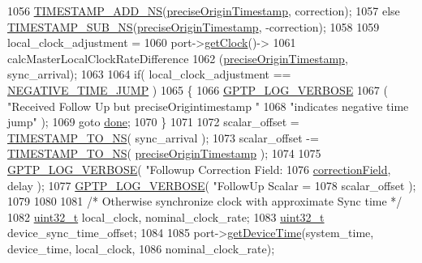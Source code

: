 \begin{DoxyCode}
1056         \hyperlink{ieee1588_8hpp_a1fb9aa7a530487fc6872dfce9a4f41b3}{TIMESTAMP\_ADD\_NS}(\hyperlink{class_p_t_p_message_follow_up_ab410646215c0bcbaf124d5923f22e2ca}{preciseOriginTimestamp}, correction);
1057     \textcolor{keywordflow}{else} \hyperlink{ieee1588_8hpp_ae4bf4339881295a97a340d4c59b0caa6}{TIMESTAMP\_SUB\_NS}(\hyperlink{class_p_t_p_message_follow_up_ab410646215c0bcbaf124d5923f22e2ca}{preciseOriginTimestamp}, -correction);
1058 
1059     local\_clock\_adjustment =
1060         port->\hyperlink{class_common_port_ab8e59ecfb51ec14e166bc8bfc872b1ef}{getClock}()->
1061         calcMasterLocalClockRateDifference
1062         (\hyperlink{class_p_t_p_message_follow_up_ab410646215c0bcbaf124d5923f22e2ca}{preciseOriginTimestamp}, sync\_arrival);
1063 
1064     \textcolor{keywordflow}{if}( local\_clock\_adjustment == \hyperlink{avbts__clock_8hpp_acd14eefdf66da61a475dc26c7a77d6d8}{NEGATIVE\_TIME\_JUMP} )
1065     \{
1066         \hyperlink{gptp__log_8hpp_add03384a2a8099b27e07d041cce77e6f}{GPTP\_LOG\_VERBOSE}
1067             ( \textcolor{stringliteral}{"Received Follow Up but preciseOrigintimestamp "}
1068               \textcolor{stringliteral}{"indicates negative time jump"} );
1069         \textcolor{keywordflow}{goto} \hyperlink{mrp_validate_8c_a5992b274cfdcacdbc1fa8347fd01ebde}{done};
1070     \}
1071 
1072     scalar\_offset = \hyperlink{ieee1588_8hpp_a0f6cecd8adce4a7314f084f3ead49999}{TIMESTAMP\_TO\_NS}( sync\_arrival );
1073     scalar\_offset -= \hyperlink{ieee1588_8hpp_a0f6cecd8adce4a7314f084f3ead49999}{TIMESTAMP\_TO\_NS}( \hyperlink{class_p_t_p_message_follow_up_ab410646215c0bcbaf124d5923f22e2ca}{preciseOriginTimestamp} );
1074 
1075     \hyperlink{gptp__log_8hpp_add03384a2a8099b27e07d041cce77e6f}{GPTP\_LOG\_VERBOSE}( \textcolor{stringliteral}{"Followup Correction Field: %
1076               \hyperlink{class_p_t_p_message_common_a635b707dac6610b5b159be5c8ec1891e}{correctionField}, delay );
1077     \hyperlink{gptp__log_8hpp_add03384a2a8099b27e07d041cce77e6f}{GPTP\_LOG\_VERBOSE}( \textcolor{stringliteral}{"FollowUp Scalar = %
1078               scalar\_offset );
1079 
1080 
1081     \textcolor{comment}{/* Otherwise synchronize clock with approximate Sync time */}
1082     \hyperlink{parse_8c_a6eb1e68cc391dd753bc8ce896dbb8315}{uint32\_t} local\_clock, nominal\_clock\_rate;
1083     \hyperlink{parse_8c_a6eb1e68cc391dd753bc8ce896dbb8315}{uint32\_t} device\_sync\_time\_offset;
1084 
1085     port->\hyperlink{class_common_port_a16ab03ee31d5e246f05098d1e89f2537}{getDeviceTime}(system\_time, device\_time, local\_clock,
1086         nominal\_clock\_rate);
}}
\end{DoxyCode}
